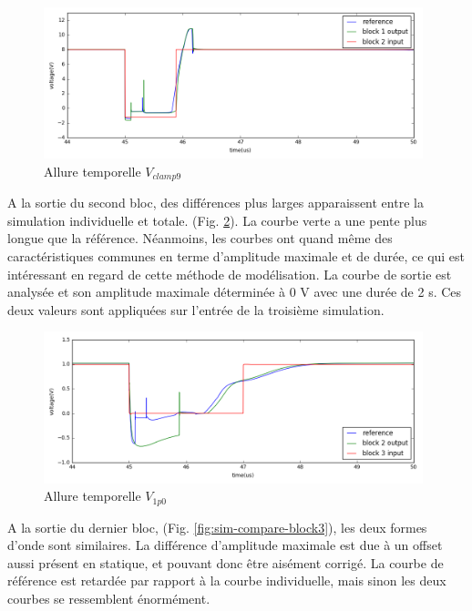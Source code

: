 \begin{figure}[!h]
  \centering
  \includegraphics[width=0.98\textwidth]{src/1/figures/simulation_comparison_block1.png}
  \caption{Allure temporelle $V_{clamp9}$}
  \label{fig:sim-compare-block1}
\end{figure}

A la sortie du second bloc, des différences plus larges apparaissent entre la simulation individuelle et totale. (Fig. \ref{fig:sim-compare-block2}).
La courbe verte a une pente plus longue que la référence.
Néanmoins, les courbes ont quand même des caractéristiques communes en terme d'amplitude maximale et de durée, ce qui est intéressant en regard de cette méthode de modélisation.
La courbe de sortie est analysée et son amplitude maximale déterminée à  0 V avec une durée de 2 \textmugreek{}s.
Ces deux valeurs sont appliquées sur l'entrée de la troisième simulation.

\begin{figure}[!h]
  \centering
  \includegraphics[width=0.98\textwidth]{src/1/figures/simulation_comparison_block2.png}
  \caption{Allure temporelle $V_{1p0}$}
  \label{fig:sim-compare-block2}
\end{figure}

A la sortie du dernier bloc, (Fig. \ref{fig:sim-compare-block3}), les deux formes d'onde sont similaires.
La différence d'amplitude maximale est due à un offset aussi présent en statique, et pouvant donc être aisément corrigé.
La courbe de référence est retardée par rapport à la courbe individuelle, mais sinon les deux courbes se ressemblent énormément.

